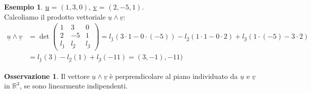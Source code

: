 \documentclass[a4paper]{article}
\theoremstyle{definition}
\newtheorem*{oss}{Osservazione}
\newtheorem*{es}{Esempio}
\begin{document}
\begin{es}
	\underline{u} = $(1, 3, 0)$, \underline{v} = $(2, -5, 1)$. \\
Calcoliamo il prodotto vettoriale $\underline{u} \wedge \underline{v}$:
\begin{align*}
	\underline{u} \wedge \underline{v} & = \det \begin{pmatrix}
		1 & 3 & 0 \\
		2 & -5 & 1 \\
		\underline{l_1} & \underline{l_2} & \underline{l_3}
	\end{pmatrix} = \underline{l_1}(3 \cdot 1 - 0 \cdot ( -5)) - \underline{l_2}(1 \cdot 1 - 0 \cdot 2) + \underline{l_3}(1 \cdot ( -5) - 3 \cdot 2) \\
	          & = \underline{l_1}(3) - \underline{l_2}(1) + \underline{l_3}(-11) = (3, - 1), -11)
\end{align*}
\end{es}

\begin{oss}
	Il vettore $\underline{u} \wedge \underline{v}$ è perprendicolare al piano individuato da $\underline{u}$ e $\underline{v}$ in $\mathbb{R}^3$,
	se sono linearmente indipendenti.
\end{oss}
\end{document}
